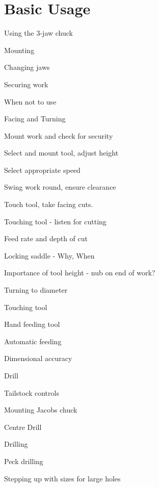 \documentclass[11pt,a5paper,twoside,openany]{book}
\newenvironment{checklist}{
  \begin{list}{}{}
  
}{%
  \end{list}
}
\begin{document}
\chapter{Basic Usage}
\begin{checklist}
\item Using the 3-jaw chuck
	\begin{checklist}
	\item Mounting
	\item Changing jaws
	\item Securing work
	\item When not to use
	\end{checklist}
\item Facing and Turning
	\begin{checklist}
	\item Mount work and check for security
	\item Select and mount tool, adjust height
	\item Select appropriate speed
	\item Swing work round, ensure clearance
	\item Touch tool, take facing cuts.
		\begin{checklist}
		\item Touching tool - listen for cutting
		\item Feed rate and depth of cut
		\item Locking saddle - Why, When
		\item Importance of tool height - nub on end of work?
		\end{checklist}
	\item Turning to diameter
		\begin{checklist}
		\item Touching tool
		\item Hand feeding tool
		\item Automatic feeding
		\item Dimensional accuracy
		\end{checklist}
	\item Drill
		\begin{checklist}
		\item Tailstock controls
		\item Mounting Jacobs chuck
		\item Centre Drill
		\item Drilling
			\begin{checklist}
			\item Peck drilling
			\item Stepping up with sizes for large holes

\end{checklist}
\end{checklist}
\end{checklist}
\end{checklist}
\end{document}
